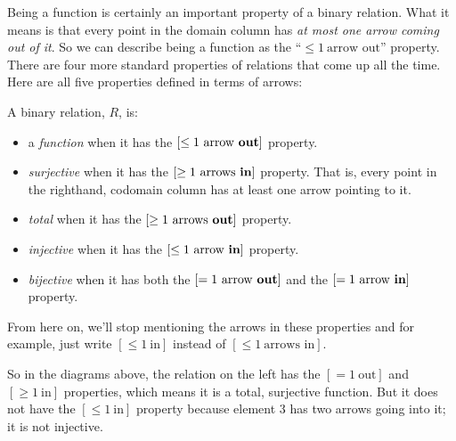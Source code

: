 Being a function is certainly an important property of a binary relation.
What it means is that every point in the domain column has \emph{at most
  one arrow coming out of it}.  So we can describe being a function as the
``$\le 1\ \text{arrow out}$'' property.  There are four more
standard properties of relations that come up all the time.  Here are all
five properties defined in terms of arrows:

\begin{definition}\label{archery-def}
A binary relation, $R$, is:
\begin{itemize}

\item a \emph{function}%
when it has the $[\le 1\ \text{arrow
    \textbf{out}}]$ property.

\item  \emph{surjective}%
%
when it has the $[\ge 1\ \text{arrows
    \textbf{in}}]$ property.  That is, every point in the righthand,
     codomain column has at least one arrow pointing to it.

\item  \emph{total} %
%
when it has the $[\ge 1\ \text{arrows
       \textbf{out}}]$ property.

\item  \emph{injective}%
%
when it has the $[\le 1\ \text{arrow
    \textbf{in}}]$ property.

\item  \emph{bijective}%
%
 when it has both the $[=1\ \text{arrow
    \textbf{out}}]$ and the $[=1\ \text{arrow \textbf{in}}]$ property.
\end{itemize}
\end{definition}

From here on, we'll stop mentioning the arrows in these properties and for
example, just write $[\le 1\ \text{in}]$ instead of $[\le 1\ \text{arrows
  in}]$.

So in the diagrams above, the relation on the left has the
$[=1\ \text{out}]$ and $[\ge 1\ \text{in}]$ properties, which means it
is a total, surjective function.  But it does not have the $[\le
  1\ \text{in}]$ property because element 3 has two arrows going into
it; it is not injective.

